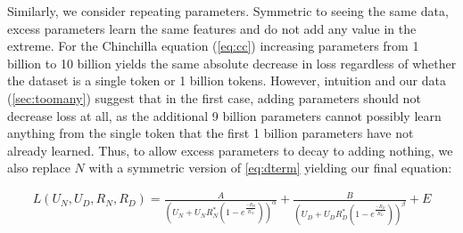 \documentclass{article}
\begin{document}







Similarly, we consider repeating parameters. Symmetric to seeing the same data, excess parameters learn the same features and do not add any value in the extreme. For the Chinchilla equation (\autoref{eq:cc}) increasing parameters from 1 billion to 10 billion yields the same absolute decrease in loss regardless of whether the dataset is a single token or 1 billion tokens. However, intuition and our data (\autoref{sec:toomany}) suggest that in the first case, adding parameters should not decrease loss at all, as the additional 9 billion parameters cannot possibly learn anything from the single token that the first 1 billion parameters have not already learned. Thus, to allow excess parameters to decay to adding nothing, we also replace $N$ with a symmetric version of \autoref{eq:dterm} yielding our final equation:

\begin{equation}\label{eq:fin}
\begin{aligned}
L(U_N,U_D,R_N,R_D)=\frac{A}{(U_N + U_N R_N^* (1 - e^{\frac{-R_N}{R_N^*}}))^\alpha} + \frac{B}{(U_D + U_D R_D^* (1 - e^{\frac{-R_D}{R_D^*}}))^\beta} + E
\end{aligned}
\end{equation}
\end{document}
